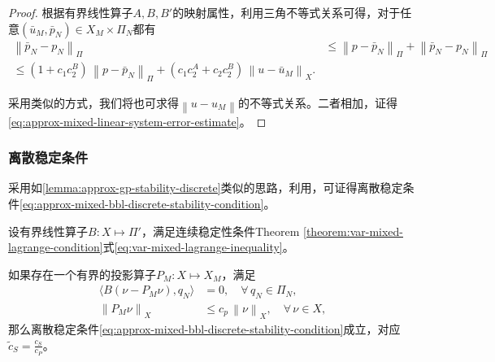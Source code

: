 \begin{proof}
  根据有界线性算子$A,B,B'$的映射属性，利用三角不等式关系可得，对于任意$\left( \bar{u}_{M}, \bar{p}_{N} \right) \in X_{M} \times \Pi_{N}$都有
  \begin{equation*}
    \begin{split}
      \left\| \bar{p}_{N} - p_{N} \right\|_{\Pi}
      & \le \left\| p - \bar{p}_{N} \right\|_{\Pi} +
      \left\| \bar{p}_{N} - p_{N} \right\|_{\Pi} \\
      \le \left( 1 + c_{1} c_{2}^{B} \right) \,
      \left\| p - \bar{p}_{N} \right\|_{\Pi} +
      \left( c_{1} c_{2}^{A} + c_{2} c_{2}^{B} \right) \,
      \left\| u - \bar{u}_{M} \right\|_{X}.
    \end{split}
  \end{equation*}

  采用类似的方式，我们将也可求得$\left\| u - u_{M} \right\|$的不等式关系。二者相加，证得\eqref{eq:approx-mixed-linear-system-error-estimate}。
\end{proof}

\subsubsection{离散稳定条件}
\label{sec:approx-mixed-bbl-prove}

采用如\eqref{lemma:approx-gp-stability-discrete}类似的思路，利用\cite{Fortin:1977vh}，可证得离散稳定条件\eqref{eq:approx-mixed-bbl-discrete-stability-condition}。

\begin{lemma}[离散稳定条件的证明]
\label{lemma:approx-mixed-bbl-prove}
设有界线性算子$B: X \mapsto \Pi'$，满足连续稳定性条件Theorem \ref{theorem:var-mixed-lagrange-condition}式\ref{eq:var-mixed-lagrange-inequality}。

如果存在一个有界的投影算子$P_{M}: X \mapsto X_{M}$，满足
\begin{equation*}
  \begin{split}
    \langle B \left( \nu - P_{M} \nu \right) , q_{N} \rangle & = 0, \quad \forall \, q_{N} \in \Pi_{N}, \\
    \left\| P_{M} \nu \right\|_{X} & \le c_{p} \, \left\| \nu \right\|_{X}, \quad \forall \, \nu \in X,
  \end{split}
\end{equation*}
那么离散稳定条件\eqref{eq:approx-mixed-bbl-discrete-stability-condition}成立，对应$\tilde{c}_{S} = \frac{c_{S}}{c_{P}}$。
\end{lemma}
